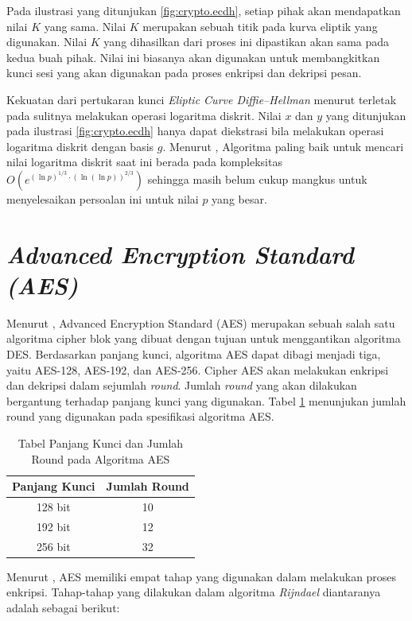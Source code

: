 Pada ilustrasi yang ditunjukan \ref{fig:crypto.ecdh}, setiap pihak akan mendapatkan nilai $K$ yang sama. Nilai $K$ merupakan sebuah titik pada kurva eliptik yang digunakan. Nilai $K$ yang dihasilkan dari proses ini dipastikan akan sama pada kedua buah pihak. Nilai ini biasanya akan digunakan untuk membangkitkan kunci sesi yang akan digunakan pada proses enkripsi dan dekripsi pesan.

Kekuatan dari pertukaran kunci \emph{Eliptic Curve Diffie–Hellman} menurut \textcite{munir2019} terletak pada sulitnya melakukan operasi logaritma diskrit. Nilai $x$ dan $y$ yang ditunjukan pada ilustrasi \ref{fig:crypto.ecdh} hanya dapat diekstrasi bila melakukan operasi logaritma diskrit dengan basis $g$. Menurut \textcite{staling2011}, Algoritma paling baik untuk mencari nilai logaritma diskrit saat ini berada pada kompleksitas $O(e^{(\ln{p})^{1/3} \cdot (\ln{(\ln{p})})^{2/3}})$ sehingga masih belum cukup mangkus untuk menyelesaikan persoalan ini untuk nilai $p$ yang besar.

\section{\emph{Advanced Encryption Standard (AES)}}
Menurut \textcite{staling2011}, Advanced Encryption Standard (AES) merupakan sebuah salah satu algoritma cipher blok yang dibuat dengan tujuan untuk menggantikan algoritma DES. Berdasarkan panjang kunci, algoritma AES dapat dibagi menjadi tiga, yaitu AES-128, AES-192, dan AES-256. Cipher AES akan melakukan enkripsi dan dekripsi dalam sejumlah \emph{round}. Jumlah \emph{round} yang akan dilakukan bergantung terhadap panjang kunci yang digunakan. Tabel \ref{tab:aes-round} menunjukan jumlah round yang digunakan pada spesifikasi algoritma AES.

\begin{longtable}{|c|c|}
  \caption{\label{tab:aes-round} Tabel Panjang Kunci dan Jumlah Round pada Algoritma AES} \\
  \hline
  Panjang Kunci & Jumlah Round \\ \hline
  128 bit       & 10           \\ \hline
  192 bit       & 12           \\ \hline
  256 bit       & 32           \\ \hline
\end{longtable}

Menurut \textcite{staling2011}, AES memiliki empat tahap yang digunakan dalam melakukan proses enkripsi. Tahap-tahap yang dilakukan dalam algoritma \emph{Rijndael} diantaranya adalah sebagai berikut:


